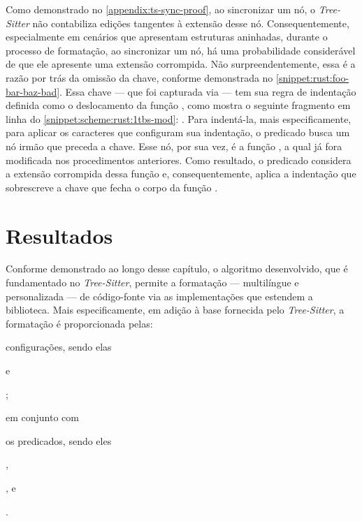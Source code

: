 \documentclass
  [11pt,a4paper,english,brazil,openright,sumario=tradicional,twoside]
  {abntex2}
\newcommand{\treesitter}{\textit{Tree-Sitter}\xspace}
\begin{document}
  Como demonstrado no \cref{appendix:ts-sync-proof}, ao sincronizar um nó, o
  \treesitter não contabiliza edições tangentes à extensão desse nó.
  Consequentemente, especialmente em cenários que apresentam estruturas
  aninhadas, durante o processo de formatação, ao sincronizar um nó, há uma
  probabilidade considerável de que ele apresente uma extensão corrompida. Não
  surpreendentemente, essa é a razão por trás da omissão da chave, conforme
  demonstrada no \cref{snippet:rust:foo-bar-baz-bad}. Essa chave --- que foi
  capturada via  --- tem sua regra de indentação
  definida como o deslocamento da função , como mostra o
  seguinte fragmento em linha do \cref{snippet:scheme:rust:1tbs-mod}:
  . Para indentá-la,
  mais especificamente, para aplicar os caracteres que configuram sua
  indentação, o predicado  busca um nó irmão que
  preceda a chave. Esse nó, por sua vez, é a função , a
  qual já fora modificada nos procedimentos anteriores. Como resultado, o
  predicado considera a extensão corrompida dessa função e, consequentemente,
  aplica a indentação que sobrescreve a chave que fecha o corpo da função
  .


  \section{Resultados}

  Conforme demonstrado ao longo desse capítulo, o algoritmo desenvolvido, que é
  fundamentado no \treesitter, permite a formatação --- multilíngue e
  personalizada --- de código-fonte via as implementações que estendem a
  biblioteca. Mais especificamente, em adição à base fornecida pelo
  \treesitter, a formatação é proporcionada pelas:
  \begin{inparaenum}
    \item configurações, sendo elas
          \begin{inparaenum}
            \item {} e
            \item {};
          \end{inparaenum}
          em conjunto com
    \item os predicados, sendo eles
          \begin{inparaenum}
            \item {},
            \item {}, e
            \item {}.
          \end{inparaenum}
  \end{inparaenum}
\end{document}
